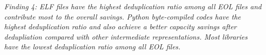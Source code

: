 \textit{Finding 4: ELF files have the highest deduplication ratio among all EOL files and contribute most to the overall savings. Python byte-compiled codes have the highest deduplication ratio and also achieve a better capacity savings after dedupliation compared with other intermediate representations. Most libraries have the lowest deduplication ratio among all EOL files.}
%
%
%
%
%
